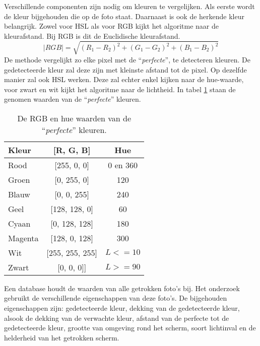 Verschillende componenten zijn nodig om kleuren te vergelijken. Als eerste wordt de kleur bijgehouden die op de foto staat. Daarnaast is ook de herkende kleur belangrijk. Zowel voor HSL als voor RGB kijkt het algoritme naar de kleurafstand. Bij RGB is dit de Euclidische kleurafstand. 
$$ \mid RGB \mid = \sqrt{(R_1 - R_2)^2 + (G_1 - G_2)^2 + (B_1 - B_2)^2}$$
De methode vergelijkt zo elke pixel met de ``{\it perfecte}'', te detecteren kleuren. De gedetecteerde kleur zal deze zijn met kleinste afstand tot de pixel. Op dezelfde manier zal ook HSL werken. Deze zal echter enkel kijken naar de hue-waarde, voor zwart en wit kijkt het algoritme naar de lichtheid. In tabel \ref{tab:kleuren}  staan de genomen waarden van de ``{\it perfecte}'' kleuren.

\begin{center}
\begin{table}
\label{tab:kleuren}
\centering
\begin{tabular}{ | l | c | c | }
\hline
Kleur & [R, G, B] & Hue \\
\hline
Rood & [255, 0, 0] & 0 en 360 \\
Groen & [0, 255, 0] & 120 \\
Blauw & [0, 0, 255] & 240 \\
Geel & [128, 128, 0] & 60 \\
Cyaan & [0, 128, 128] & 180 \\
Magenta & [128, 0, 128] & 300 \\
Wit & [255, 255, 255] & $L <= 10$ \\
Zwart & [0, 0, 0]] & $L >= 90$ \\
\hline
\end{tabular}
\caption{De RGB en hue waarden van de ``{\it perfecte}'' kleuren.}
\end{table}
\end{center}

Een database houdt de waarden van alle getrokken foto's bij. Het onderzoek gebruikt de verschillende eigenschappen van deze foto's. De bijgehouden eigenschappen zijn: gedetecteerde kleur, dekking van de gedetecteerde kleur, alsook de dekking van de verwachte kleur, afstand van de perfecte tot de gedetecteerde kleur, grootte van omgeving rond het scherm, soort lichtinval en de helderheid van het getrokken scherm.